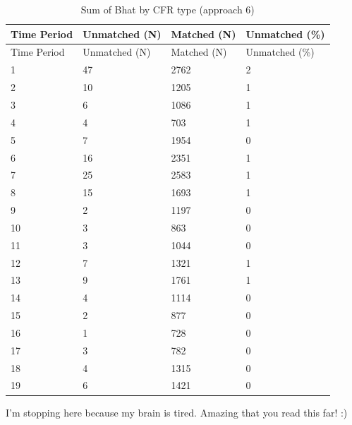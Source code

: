 \documentclass[
]{article}
\begin{document}
\begin{longtable}[]{@{}llll@{}}
\caption{Sum of Bhat by CFR type (approach 6)}\tabularnewline
\toprule
Time Period & Unmatched (N) & Matched (N) & Unmatched (\%) \\
\midrule
\endfirsthead
\toprule
Time Period & Unmatched (N) & Matched (N) & Unmatched (\%) \\
\midrule
\endhead
1 & 47 & 2762 & 2 \\
2 & 10 & 1205 & 1 \\
3 & 6 & 1086 & 1 \\
4 & 4 & 703 & 1 \\
5 & 7 & 1954 & 0 \\
6 & 16 & 2351 & 1 \\
7 & 25 & 2583 & 1 \\
8 & 15 & 1693 & 1 \\
9 & 2 & 1197 & 0 \\
10 & 3 & 863 & 0 \\
11 & 3 & 1044 & 0 \\
12 & 7 & 1321 & 1 \\
13 & 9 & 1761 & 1 \\
14 & 4 & 1114 & 0 \\
15 & 2 & 877 & 0 \\
16 & 1 & 728 & 0 \\
17 & 3 & 782 & 0 \\
18 & 4 & 1315 & 0 \\
19 & 6 & 1421 & 0 \\
\bottomrule
\end{longtable}

I'm stopping here because my brain is tired. Amazing that you read this
far! :)
\end{document}
